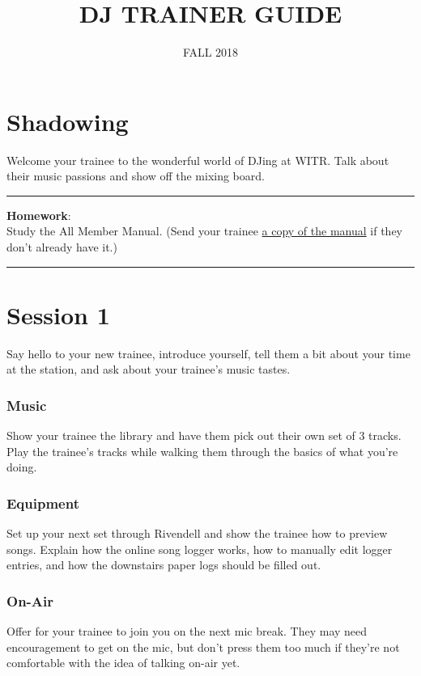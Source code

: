 \documentclass[]{witrman}
\title{DJ TRAINER GUIDE}
\date{FALL 2018}
\newcommand{\makehomework}[1]{%
\vspace{1mm}
\rule{\textwidth}{1pt}
\textbf{Homework}:\\
#1\\
\rule[2mm]{\textwidth}{1pt}
}
\begin{document}
\maketitle

\maketoc{}

\setpagebg{}

\chapter{Shadowing}

Welcome your trainee to the wonderful world of DJing at WITR\@. Talk about their
music passions and show off the mixing board.

\makehomework{Study the All Member Manual.  (Send your trainee
\href{https://github.com/WITR-Radio/manuals/releases}{a copy of the
manual} if they don't already have it.)}


\chapter{Session 1}

Say hello to your new trainee, introduce yourself, tell them a bit about your
time at the station, and ask about your trainee's music tastes.

\subsection{Music}

Show your trainee the library and have them pick out their own set of 3 tracks.
Play the trainee's tracks while walking them through the basics of what you're
doing.

\subsection{Equipment}

Set up your next set through Rivendell and show the trainee how to preview
songs.  Explain how the online song logger works, how to manually edit logger
entries, and how the downstairs paper logs should be filled out.

\subsection{On-Air}

Offer for your trainee to join you on the next mic break.  They may need
encouragement to get on the mic, but don't press them too much if they're not
comfortable with the idea of talking on-air yet.
\end{document}

